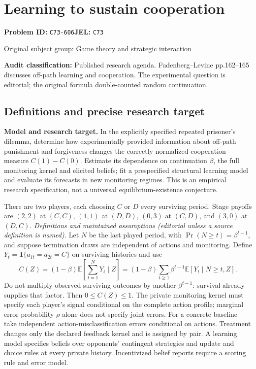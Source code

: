\documentclass[11pt,a4paper]{article}
\begin{document}
\section*{Learning to sustain cooperation}
\textbf{Problem ID:} \texttt{C73-606}\quad \textbf{JEL:} \texttt{C73}\par
\label{problem:OP-0282}
{\sffamily\small\color{muted}Original subject group: Game theory and strategic interaction\par}
\label{definitions:problem:30007564}
\textbf{Audit classification:} Published research agenda. Fudenberg–Levine pp.162–165 discusses off-path learning and cooperation. The experimental question is editorial; the original formula double-counted random continuation.
\subsection*{Definitions and precise research target}
\textbf{Model and research target.} In the explicitly specified repeated prisoner’s dilemma, determine how experimentally provided information about off-path punishment and forgiveness changes the correctly normalized cooperation measure \(C(1)-C(0)\). Estimate its dependence on continuation \(\beta\), the full monitoring kernel and elicited beliefs; fit a prespecified structural learning model and evaluate its forecasts in new monitoring regimes. This is an empirical research specification, not a universal equilibrium-existence conjecture.

There are two players, each choosing \(C\) or \(D\) every surviving period. Stage payoffs are \((2,2)\) at \((C,C)\), \((1,1)\) at \((D,D)\), \((0,3)\) at \((C,D)\), and \((3,0)\) at \((D,C)\). \emph{Definitions and maintained assumptions (editorial unless a source definition is named).} Let \(N\) be the last played period, with \(\Pr(N\ge t)=\beta^{t-1}\), and suppose termination draws are independent of actions and monitoring. Define \(Y_t=\mathbf1\{a_{1t}=a_{2t}=C\}\) on surviving histories and use
\[C(Z)=(1-\beta)\mathbb E\!\left[\sum_{t=1}^{N}Y_t\mid Z\right]=(1-\beta)\sum_{t\ge1}\beta^{t-1}\mathbb E[Y_t\mid N\ge t,Z].\]
Do not multiply observed surviving outcomes by another \(\beta^{t-1}\): survival already supplies that factor. Then \(0\le C(Z)\le1\). The private monitoring kernel must specify each player’s signal conditional on the complete action profile; marginal error probability \(\rho\) alone does not specify joint errors. For a concrete baseline take independent action-misclassification errors conditional on actions. Treatment changes only the declared feedback kernel and is assigned by pair. A learning model specifies beliefs over opponents’ contingent strategies and update and choice rules at every private history. Incentivized belief reports require a scoring rule and error model.
\end{document}
